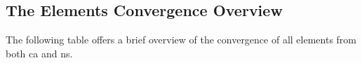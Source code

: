 \subsection{The Elements Convergence Overview}

The following table offers a brief overview of the convergence of all elements from both
\gls{ca} and \gls{ns}.

    

